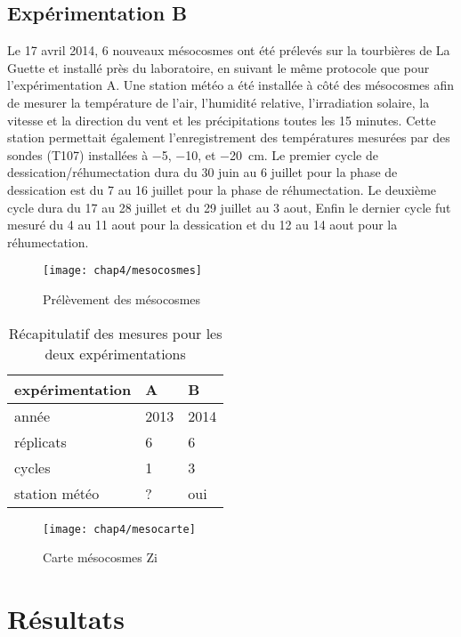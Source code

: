 \subsection{Expérimentation B}
Le 17 avril 2014, 6 nouveaux mésocosmes ont été prélevés sur la tourbières de La Guette et installé près du laboratoire, en suivant le même protocole que pour l'expérimentation A.
Une station météo a été installée à côté des mésocosmes afin de mesurer la température de l'air, l'humidité relative, l'irradiation solaire, la vitesse et la direction du vent et les précipitations toutes les 15 minutes.
Cette station permettait également l'enregistrement des températures mesurées par des sondes (T107) installées à \num{-5}, \num{-10}, et \SI{-20}{\centi\metre}.
Le premier cycle de dessication/réhumectation dura du 30 juin au 6 juillet pour la phase de dessication est du 7 au 16 juillet pour la phase de réhumectation.
Le deuxième cycle dura du 17 au 28 juillet et du 29 juillet au 3 aout, 
Enfin le dernier cycle fut mesuré du 4 au 11 aout pour la dessication et du 12 au 14 aout pour la réhumectation.



\begin{figure}
\centering
\texttt{[image: chap4/mesocosmes]}
\caption{Prélèvement des mésocosmes}
\label{fig:mesophoto}
\end{figure}


\begin{table}
\centering
\caption{Récapitulatif des mesures pour les deux expérimentations}
\label{table:recap_hm}
\begin{tabular}{lll}\toprule
expérimentation & A & B \\ \midrule
année & 2013 & 2014 \\
réplicats & 6 & 6 \\
cycles & 1 & 3 \\
station météo & ? & oui\\
\bottomrule
\end{tabular}
\end{table}


\begin{figure}
\centering
\texttt{[image: chap4/mesocarte]}
\caption{Carte mésocosmes Zi}
\label{fig:mesocarte}
\end{figure}

\section{Résultats}

